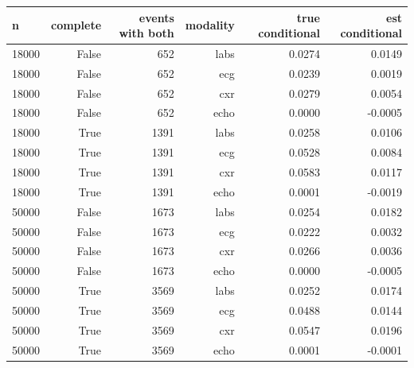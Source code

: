 \begin{tabular}{lrrrrr}
\toprule
\textbf{n} & \textbf{complete} & \textbf{events with both} & \textbf{modality} & \textbf{true conditional} & \textbf{est conditional} \\
\midrule
18000 & False & 652 & labs & 0.0274 & 0.0149 \\
18000 & False & 652 & ecg & 0.0239 & 0.0019 \\
18000 & False & 652 & cxr & 0.0279 & 0.0054 \\
18000 & False & 652 & echo & 0.0000 & -0.0005 \\
18000 & True & 1391 & labs & 0.0258 & 0.0106 \\
18000 & True & 1391 & ecg & 0.0528 & 0.0084 \\
18000 & True & 1391 & cxr & 0.0583 & 0.0117 \\
18000 & True & 1391 & echo & 0.0001 & -0.0019 \\
50000 & False & 1673 & labs & 0.0254 & 0.0182 \\
50000 & False & 1673 & ecg & 0.0222 & 0.0032 \\
50000 & False & 1673 & cxr & 0.0266 & 0.0036 \\
50000 & False & 1673 & echo & 0.0000 & -0.0005 \\
50000 & True & 3569 & labs & 0.0252 & 0.0174 \\
50000 & True & 3569 & ecg & 0.0488 & 0.0144 \\
50000 & True & 3569 & cxr & 0.0547 & 0.0196 \\
50000 & True & 3569 & echo & 0.0001 & -0.0001 \\
\bottomrule
\end{tabular}
